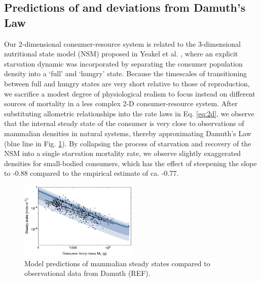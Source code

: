\documentclass[11pt]{article}
\begin{document}
\subsection*{Predictions of and deviations from Damuth's Law}
Our 2-dimensional consumer-resource system is related to the 3-dimensional nutritional state model (NSM) proposed in Yeakel et al. \citep{yeakel2018dynamics}, where an explicit starvation dynamic was incorporated by separating the consumer population density into a `full' and `hungry' state.
Because the timescales of transitioning between full and hungry states are very short relative to those of reproduction, we sacrifice a modest degree of physiological realism to focus instead on different sources of mortality in a less complex 2-D consumer-resource system.
After substituting allometric relationships into the rate laws in Eq. \ref{eq:2d}, we observe that the internal steady state of the consumer is very close to observations of mammalian densities in natural systems, thereby approximating Damuth's Law (blue line in Fig. \ref{fig:2ddensities}).
By collapsing the process of starvation and recovery of the NSM into a single starvation mortality rate, we observe slightly exaggerated densities for small-bodied consumers, which has the effect of steepening the slope to -0.88 compared to the empirical estimate of ca. -0.77.



\begin{figure}[h!]
\centering
\includegraphics[width=0.5\textwidth]{fig_consumer2d_resources.pdf}
\caption{
\footnotesize
Model predictions of mammalian steady states compared to observational data from Damuth (REF).}
\label{fig:2ddensities}
\end{figure}



\end{document}
